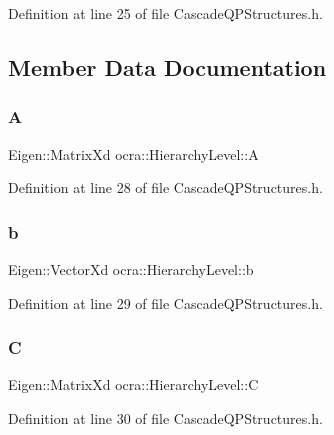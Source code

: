 Definition at line 25 of file Cascade\+Q\+P\+Structures.\+h.



\subsection{Member Data Documentation}
\hypertarget{structocra_1_1HierarchyLevel_a19bc3f9c063348621857c7bcc5c391c7}{}\label{structocra_1_1HierarchyLevel_a19bc3f9c063348621857c7bcc5c391c7} 
\subsubsection{\texorpdfstring{A}{A}}
{\footnotesize\ttfamily Eigen\+::\+Matrix\+Xd ocra\+::\+Hierarchy\+Level\+::A}



Definition at line 28 of file Cascade\+Q\+P\+Structures.\+h.

\hypertarget{structocra_1_1HierarchyLevel_aedcf136bbf54aa0ff910b3a3ce3d43be}{}\label{structocra_1_1HierarchyLevel_aedcf136bbf54aa0ff910b3a3ce3d43be} 
\subsubsection{\texorpdfstring{b}{b}}
{\footnotesize\ttfamily Eigen\+::\+Vector\+Xd ocra\+::\+Hierarchy\+Level\+::b}



Definition at line 29 of file Cascade\+Q\+P\+Structures.\+h.

\hypertarget{structocra_1_1HierarchyLevel_ad33118f78c391492062c6b3687c2e20d}{}\label{structocra_1_1HierarchyLevel_ad33118f78c391492062c6b3687c2e20d} 
\subsubsection{\texorpdfstring{C}{C}}
{\footnotesize\ttfamily Eigen\+::\+Matrix\+Xd ocra\+::\+Hierarchy\+Level\+::C}



Definition at line 30 of file Cascade\+Q\+P\+Structures.\+h.

\hypertarget{structocra_1_1HierarchyLevel_ad1c6f525af33862743514fd5cf3e8c76}{}\label{structocra_1_1HierarchyLevel_ad1c6f525af33862743514fd5cf3e8c76} 
